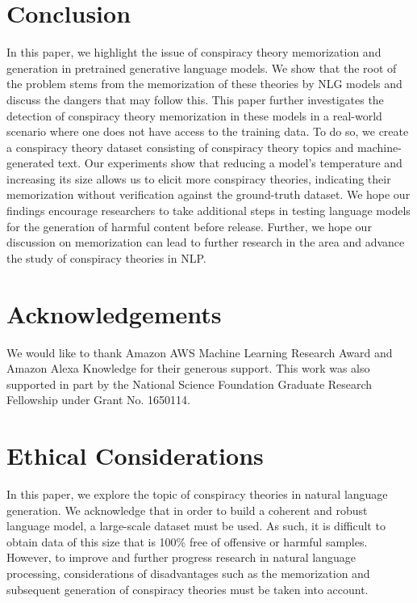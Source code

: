 \documentclass[11pt,a4paper]{article}
\begin{document}
\section{Conclusion}
In this paper, we highlight the issue of conspiracy theory memorization and generation in pretrained generative language models. We show that the root of the problem stems from the memorization of these theories by NLG models and discuss the dangers that may follow this. This paper further investigates the detection of conspiracy theory memorization in these models in a real-world scenario where one does not have access to the training data. To do so, we create a conspiracy theory dataset consisting of conspiracy theory topics and machine-generated text. Our experiments show that reducing a model's temperature and increasing its size allows us to elicit more conspiracy theories, indicating their memorization without verification against the ground-truth dataset. We hope our findings encourage researchers to take additional steps in testing language models for the generation of harmful content before release. Further, we hope our discussion on memorization can lead to further research in the area and advance the study of conspiracy theories in NLP.

\section*{Acknowledgements}
We would like to thank Amazon AWS Machine Learning Research Award and Amazon Alexa Knowledge for their generous support. This work was also supported in part by the National Science Foundation Graduate Research Fellowship under Grant No. 1650114.

\section*{Ethical Considerations}
In this paper, we explore the topic of conspiracy theories in natural language generation. We acknowledge that in order to build a coherent and robust language model, a large-scale dataset must be used. As such, it is difficult to obtain data of this size that is 100\% free of offensive or harmful samples. However, to improve and further progress research in natural language processing, considerations of disadvantages such as the memorization and subsequent generation of conspiracy theories must be taken into account. 
\end{document}
